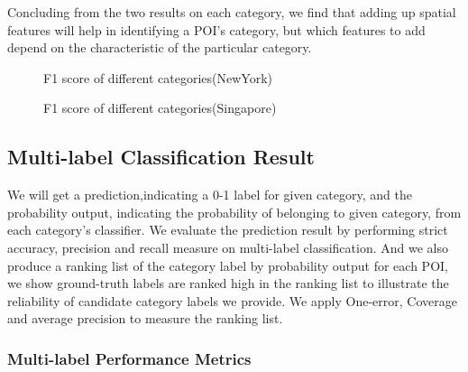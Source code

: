 Concluding from the two results on each category, we find that adding up spatial features will help in identifying a POI's category, but which features to add depend on the characteristic of the particular category.


\begin{figure}[h]
\centering
\caption{F1 score of different categories(NewYork)}
\label{fig:NewYorkF1}       %
\end{figure}
\begin{figure}[h]
\centering
\caption{F1 score of different categories(Singapore)}
\label{fig:SingaporeF1}       %
\end{figure}

\subsection{Multi-label Classification Result}
We will get a prediction,indicating a 0-1 label for given category, and the probability output, indicating the probability of belonging to given category, from each category's classifier. We evaluate the prediction result by performing strict accuracy, precision and recall measure on multi-label classification. And we also produce a ranking list of the category label by probability output for each POI, we show ground-truth labels are ranked high in the ranking list to illustrate the reliability of candidate category labels we provide. We apply One-error, Coverage and average precision to measure the ranking list.
\subsubsection{Multi-label Performance Metrics}
